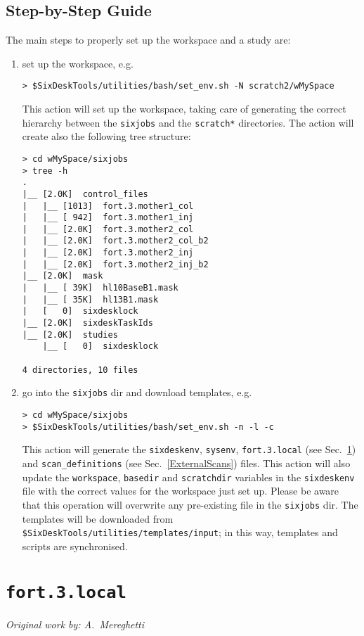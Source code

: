 \subsection{Step-by-Step Guide}
The main steps to properly set up the workspace and a study are:
\begin{enumerate}
\item set up the workspace, e.g.
\begin{lstlisting}
> $SixDeskTools/utilities/bash/set_env.sh -N scratch2/wMySpace
\end{lstlisting}
This action will set up the workspace, taking care of generating
the correct hierarchy between the \texttt{sixjobs} and the \texttt{scratch*}
directories. The action will create also the following tree structure:
\begin{lstlisting}
> cd wMySpace/sixjobs
> tree -h
.
|__ [2.0K]  control_files
|   |__ [1013]  fort.3.mother1_col
|   |__ [ 942]  fort.3.mother1_inj
|   |__ [2.0K]  fort.3.mother2_col
|   |__ [2.0K]  fort.3.mother2_col_b2
|   |__ [2.0K]  fort.3.mother2_inj
|   |__ [2.0K]  fort.3.mother2_inj_b2
|__ [2.0K]  mask
|   |__ [ 39K]  hl10BaseB1.mask
|   |__ [ 35K]  hl13B1.mask
|   [   0]  sixdesklock
|__ [2.0K]  sixdeskTaskIds
|__ [2.0K]  studies
    |__ [   0]  sixdesklock

4 directories, 10 files
\end{lstlisting}
\item go into the \texttt{sixjobs} dir and download templates, e.g.
\begin{lstlisting}
> cd wMySpace/sixjobs
> $SixDeskTools/utilities/bash/set_env.sh -n -l -c
\end{lstlisting}
This action will generate the \texttt{sixdeskenv}, \texttt{sysenv},
\texttt{fort.3.local} (see Sec.~\ref{fort3local}) and
\texttt{scan\_definitions} (see Sec.~\ref{ExternalScans}) files.
This action will also update
the \texttt{workspace}, \texttt{basedir} and \texttt{scratchdir}
variables in the \texttt{sixdeskenv} file
with the correct values for the workspace just set up.
Please be aware that this operation will overwrite any
pre-existing file in the \texttt{sixjobs} dir. The templates
will be downloaded from
\texttt{\${SixDeskTools}/utilities/templates/input};
in this way, templates and scripts are synchronised.
\end{enumerate}

\section{\texttt{fort.3.local}} \label{fort3local}
\begin{flushright}
\emph{Original work by: A.~Mereghetti}
\end{flushright}


